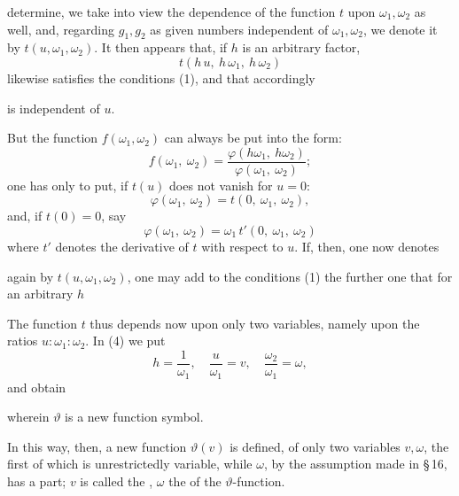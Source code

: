 determine, we take into view the dependence of the function $t$ upon
$\omega_1, \omega_2$ as well, and, regarding $g_1, g_2$ as given numbers
independent of $\omega_1, \omega_2$, we denote it by
$t(u, \omega_1, \omega_2)$. It then appears that, if $h$ is an arbitrary
factor,
\[
t(h\,u,\ h\,\omega_1,\ h\,\omega_2)
\]
likewise satisfies the conditions (1), and that accordingly


is independent of $u$.

But the function $f(\omega_1, \omega_2)$ can always be put into the
form:
\[
f(\omega_1,\ \omega_2) = \frac{\varphi(h\omega_1,\ h\omega_2)}{\varphi(\omega_1,\ \omega_2)};
\]
one has only to put, if $t(u)$ does not vanish for $u = 0$:
\[
\varphi(\omega_1,\ \omega_2) = t(0,\ \omega_1,\ \omega_2),
\]
and, if $t(0) = 0$, say
\[
\varphi(\omega_1,\ \omega_2) = \omega_1\, t'(0,\ \omega_1,\ \omega_2)
\]
where $t'$ denotes the derivative of $t$ with respect to $u$. If, then,
one now denotes


again by $t(u, \omega_1, \omega_2)$, one may add to the conditions (1)
the further one that for an arbitrary $h$


The function $t$ thus depends now upon only two variables, namely upon
the ratios $u : \omega_1 : \omega_2$. In (4) we put
\[
h = \frac{1}{\omega_1},\quad \frac{u}{\omega_1} = v,\quad \frac{\omega_2}{\omega_1} = \omega,
\]
and obtain


wherein $\vartheta$ is a new function symbol.

In this way, then, a new function $\vartheta(v)$ is defined, of only
two variables $v, \omega$, the first of which is unrestrictedly
variable, while $\omega$, by the assumption made in \S\,16, has a
 part; $v$ is called the ,
$\omega$ the  of the $\vartheta$-function.
